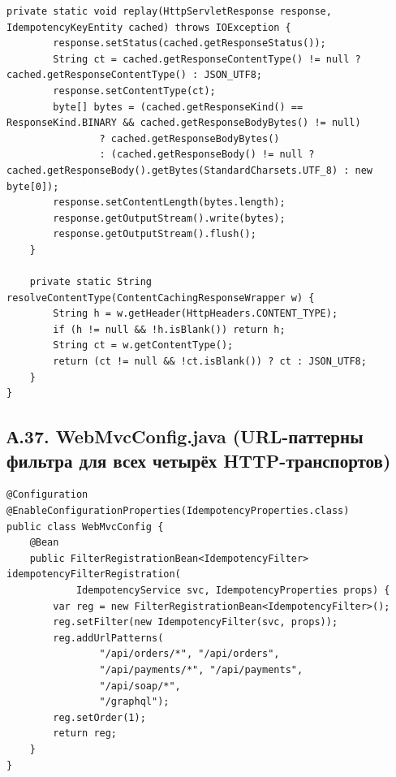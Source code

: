 \begin{lstlisting}[caption={Фильтр сохраняет реальный Content-Type и пишет байты через OutputStream}]
    private static void replay(HttpServletResponse response, IdempotencyKeyEntity cached) throws IOException {
        response.setStatus(cached.getResponseStatus());
        String ct = cached.getResponseContentType() != null ? cached.getResponseContentType() : JSON_UTF8;
        response.setContentType(ct);
        byte[] bytes = (cached.getResponseKind() == ResponseKind.BINARY && cached.getResponseBodyBytes() != null)
                ? cached.getResponseBodyBytes()
                : (cached.getResponseBody() != null ? cached.getResponseBody().getBytes(StandardCharsets.UTF_8) : new byte[0]);
        response.setContentLength(bytes.length);
        response.getOutputStream().write(bytes);
        response.getOutputStream().flush();
    }

    private static String resolveContentType(ContentCachingResponseWrapper w) {
        String h = w.getHeader(HttpHeaders.CONTENT_TYPE);
        if (h != null && !h.isBlank()) return h;
        String ct = w.getContentType();
        return (ct != null && !ct.isBlank()) ? ct : JSON_UTF8;
    }
}
\end{lstlisting}

\subsection*{А.37. WebMvcConfig.java (URL-паттерны фильтра для всех четырёх HTTP-транспортов)}
\begin{lstlisting}[caption={Единый бин IdempotencyFilter перехватывает 4 транспорта}]
@Configuration
@EnableConfigurationProperties(IdempotencyProperties.class)
public class WebMvcConfig {
    @Bean
    public FilterRegistrationBean<IdempotencyFilter> idempotencyFilterRegistration(
            IdempotencyService svc, IdempotencyProperties props) {
        var reg = new FilterRegistrationBean<IdempotencyFilter>();
        reg.setFilter(new IdempotencyFilter(svc, props));
        reg.addUrlPatterns(
                "/api/orders/*", "/api/orders",
                "/api/payments/*", "/api/payments",
                "/api/soap/*",
                "/graphql");
        reg.setOrder(1);
        return reg;
    }
}
\end{lstlisting}


